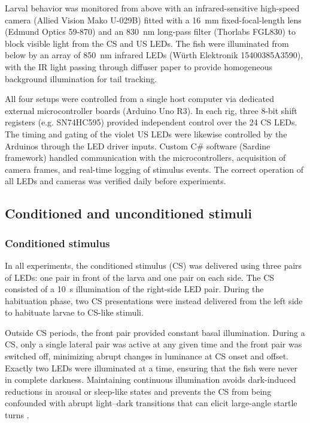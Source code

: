 Larval behavior was monitored from above with an infrared-sensitive high-speed camera (Allied Vision Mako U-029B) fitted with a \SI{16}{\milli\meter} fixed-focal-length lens (Edmund Optics 59-870) and an \SI{830}{\nano\meter} long-pass filter (Thorlabs FGL830) to block visible light from the CS and US LEDs. The fish were illuminated from below by an array of \SI{850}{\nano\meter} infrared LEDs (Würth Elektronik 15400385A3590), with the IR light passing through diffuser paper to provide homogeneous background illumination for tail tracking.

All four setups were controlled from a single host computer via dedicated external microcontroller boards (Arduino Uno R3). In each rig, three 8-bit shift registers (e.g. SN74HC595) provided independent control over the 24 CS LEDs. The timing and gating of the violet US LEDs were likewise controlled by the Arduinos through the LED driver inputs. Custom C\# software (Sardine framework) handled communication with the microcontrollers, acquisition of camera frames, and real-time logging of stimulus events. The correct operation of all LEDs and cameras was verified daily before experiments.



\subsection{Conditioned and unconditioned stimuli}




\subsubsection{Conditioned stimulus}

In all experiments, the conditioned stimulus (CS) was delivered using three pairs of LEDs: one pair in front of the larva and one pair on each side. The CS consisted of a \SI{10}{\second} illumination of the right-side LED pair. During the habituation phase, two CS presentations were instead delivered from the left side to habituate larvae to CS-like stimuli.

Outside CS periods, the front pair provided constant basal illumination. During a CS, only a single lateral pair was active at any given time and the front pair was switched off, minimizing abrupt changes in luminance at CS onset and offset. Exactly two LEDs were illuminated at a time, ensuring that the fish were never in complete darkness. Maintaining continuous illumination avoids dark-induced reductions in arousal or sleep-like states \citep{Prober2006} and prevents the CS from being confounded with abrupt light--dark transitions that can elicit large-angle startle turns \citep{Burgess2007}.

